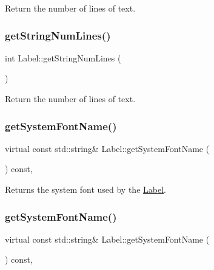Return the number of lines of text. \mbox{\label{classLabel_ab412a9bf4034e5ac27293fe9b44b654a}} 
\subsubsection{\texorpdfstring{get\+String\+Num\+Lines()}{getStringNumLines()}\hspace{0.1cm}{\footnotesize\ttfamily [2/2]}}
{\footnotesize\ttfamily int Label\+::get\+String\+Num\+Lines (\begin{DoxyParamCaption}{ }\end{DoxyParamCaption})}

Return the number of lines of text. \mbox{\label{classLabel_af88224444451a961ebf950e503e8dc29}} 
\subsubsection{\texorpdfstring{get\+System\+Font\+Name()}{getSystemFontName()}\hspace{0.1cm}{\footnotesize\ttfamily [1/2]}}
{\footnotesize\ttfamily virtual const std\+::string\& Label\+::get\+System\+Font\+Name (\begin{DoxyParamCaption}{ }\end{DoxyParamCaption}) const\hspace{0.3cm}{\ttfamily [inline]}, {\ttfamily [virtual]}}

Returns the system font used by the \hyperlink{classLabel}{Label}. \mbox{\label{classLabel_af88224444451a961ebf950e503e8dc29}} 
\subsubsection{\texorpdfstring{get\+System\+Font\+Name()}{getSystemFontName()}\hspace{0.1cm}{\footnotesize\ttfamily [2/2]}}
{\footnotesize\ttfamily virtual const std\+::string\& Label\+::get\+System\+Font\+Name (\begin{DoxyParamCaption}{ }\end{DoxyParamCaption}) const\hspace{0.3cm}{\ttfamily [inline]}, {\ttfamily [virtual]}}

